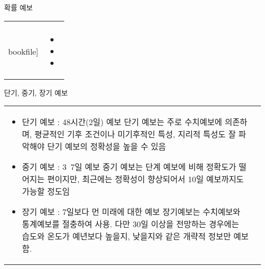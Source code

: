 \begin{frame}[t]{확률 예보}
	\begin{tabular}{ll}
		\begin{minipage}[t]{0.5\textwidth}\scriptsize
			\begin{figure}[t]
				\texttt{[image: \\bookfile]}
			\end{figure}						
		\end{minipage}	
		&
		\begin{minipage}[t]{0.35\textwidth} \scriptsize	
			\begin{itemize}
				\item 				
				\item 
				\item 
				
			\end{itemize}

		\end{minipage}
	\end{tabular}
\end{frame}



\begin{frame}[t]{단기, 중기, 장기 예보}
	\begin{tabular}{ll}
		\begin{minipage}[t]{0.6\textwidth}\scriptsize
			\begin{itemize}
				\item 단기 예보 : 48시간(2일) 예보
					단기 예보는 주로 수치예보에 의존하며, 평균적인 기후 조건이나 미기후적인 특성, 지리적 특성도 잘 파악해야 단기 예보의 정확성을 높을 수 있음
	
				\item 중기 예보 : 3~7일 예보
    				중기 예보는 단계 예보에 비해 정확도가 떨어지는 편이지만, 최근에는 정확성이 향상되어서 10일 예보까지도 가능할 정도임
				
				\item 장기 예보 : 7일보다 먼 미래에 대한 예보
    				장기예보는 수치예보와 통계예보를 절충하여 사용. 다만 30일 이상을 전망하는 경우에는 습도와 온도가 예년보다 높을지, 낮을지와 같은 개략적 정보만 예보함. 
					
			\end{itemize}
		\end{minipage}	
		&
		\begin{minipage}[t]{0.35\textwidth} \scriptsize	
			

		\end{minipage}
	\end{tabular}
\end{frame}



